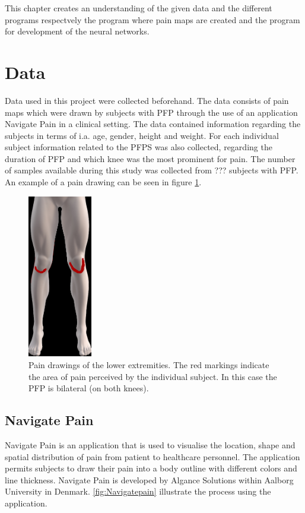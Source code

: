 This chapter creates an understanding of the given data and the different programs respectvely the program where pain maps are created and the program for development of the neural networks. 

\section{Data}
Data used in this project were collected beforehand. The data consists of pain maps which were drawn by subjects with PFP through the use of an application Navigate Pain in a clinical setting. The data contained information regarding the subjects in terms of i.a. age, gender, height and weight. For each individual subject information related to the PFPS was also collected, regarding the duration of PFP and which knee was the most prominent for pain. 
The number of samples available during this study was collected from ??? subjects with PFP. An example of a pain drawing can be seen in figure \ref{fig:kneepainmap}. 

\begin{figure} [H]
\centering
\includegraphics[width=0.25\textwidth]{figures/kneepainmap}
\caption{Pain drawings of the lower extremities. The red markings indicate the area of pain perceived by the individual subject. In this case the PFP is bilateral (on both knees).}
\label{fig:kneepainmap}
\end{figure}

\subsection{Navigate Pain}
Navigate Pain is an application that is used to visualise the location, shape and spatial distribution of pain from patient to healthcare personnel. The application permits subjects to draw their pain into a body outline with different colors and line thickness. Navigate Pain is developed by Algance Solutions within Aalborg University in Denmark.\citep{Solutions2015}
\autoref{fig:Navigatepain} illustrate the process using the application.

